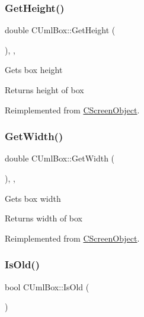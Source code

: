 \subsubsection{\texorpdfstring{GetHeight()}{GetHeight()}}
{\footnotesize\ttfamily double C\+Uml\+Box\+::\+Get\+Height (\begin{DoxyParamCaption}{ }\end{DoxyParamCaption})\hspace{0.3cm}{\ttfamily [inline]}, {\ttfamily [override]}, {\ttfamily [virtual]}}

Gets box height \begin{DoxyReturn}{Returns}
height of box 
\end{DoxyReturn}


Reimplemented from \mbox{\hyperlink{class_c_screen_object_a5951174e223dbfe0fe9ed264905130a9}{C\+Screen\+Object}}.

\mbox{\label{class_c_uml_box_a511859ee5042e1af916947bd22c5c18a}} 
\subsubsection{\texorpdfstring{GetWidth()}{GetWidth()}}
{\footnotesize\ttfamily double C\+Uml\+Box\+::\+Get\+Width (\begin{DoxyParamCaption}{ }\end{DoxyParamCaption})\hspace{0.3cm}{\ttfamily [inline]}, {\ttfamily [override]}, {\ttfamily [virtual]}}

Gets box width \begin{DoxyReturn}{Returns}
width of box 
\end{DoxyReturn}


Reimplemented from \mbox{\hyperlink{class_c_screen_object_ac32f1b9ea19e703276b2a8880edd4022}{C\+Screen\+Object}}.

\mbox{\label{class_c_uml_box_a5b47b46b1908f3c6adc06978ff88f148}} 
\subsubsection{\texorpdfstring{IsOld()}{IsOld()}}
{\footnotesize\ttfamily bool C\+Uml\+Box\+::\+Is\+Old (\begin{DoxyParamCaption}{ }\end{DoxyParamCaption})\hspace{0.3cm}{\ttfamily [inline]}}

